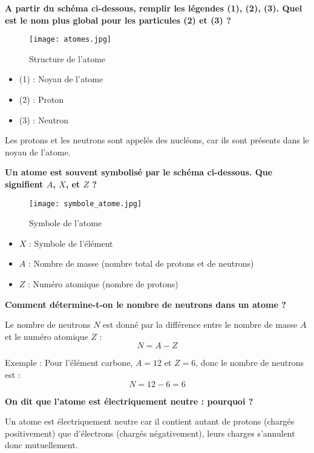 \documentclass{exam}
\begin{document}
\begin{questions}
  \question[1] \textbf{A partir du schéma ci-dessous, remplir les légendes (1), (2), (3). Quel est le nom plus global pour les particules (2) et (3) ?}

  \begin{figure}[H]
    \centering
    \texttt{[image: atomes.jpg]}
    \caption{\label{} Structure de l'atome}
  \end{figure}

  \begin{itemize}
    \item (1) : Noyau de l'atome
    \item (2) : Proton
    \item (3) : Neutron
  \end{itemize}
  Les protons et les neutrons sont appelés des nucléons, car ils sont présents dans le noyau de l'atome.

  \question[1] \textbf{Un atome est souvent symbolisé par le schéma ci-dessous. Que signifient $A$, $X$, et $Z$ ?}

  \begin{figure}[H]
    \centering
    \texttt{[image: symbole\_atome.jpg]}
    \caption{\label{} Symbole de l'atome}
  \end{figure}

  \begin{itemize}
    \item $X$ : Symbole de l'élément
    \item $A$ : Nombre de masse (nombre total de protons et de neutrons)
    \item $Z$ : Numéro atomique (nombre de protons)
  \end{itemize}

  \question[1] \textbf{Comment détermine-t-on le nombre de neutrons dans un atome ?}

  Le nombre de neutrons $N$ est donné par la différence entre le nombre de masse $A$ et le numéro atomique $Z$ :
  \[
  N = A - Z
  \]

  Exemple : Pour l'élément carbone, $A = 12$ et $Z = 6$, donc le nombre de neutrons est :
  \[
  N = 12 - 6 = 6
  \]

  \question[0.5] \textbf{On dit que l'atome est électriquement neutre : pourquoi ?}

  Un atome est électriquement neutre car il contient autant de protons (chargés positivement) que d'électrons (chargés négativement), leurs charges s'annulent donc mutuellement.

\end{questions}
\end{document}
